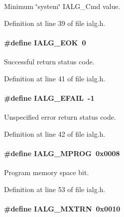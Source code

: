 Minimum \char`\"{}system\char`\"{} IALG\_\-Cmd value. 

Definition at line 39 of file ialg.h.\hypertarget{group__ti__xdais___i_a_l_g_g2c15898121a23a164e4ea2bcc4f7e7dc}{
\paragraph[IALG\_\-EOK]{\setlength{\rightskip}{0pt plus 5cm}\#define IALG\_\-EOK~0}\hfill}
\label{group__ti__xdais___i_a_l_g_g2c15898121a23a164e4ea2bcc4f7e7dc}


Successful return status code. 

Definition at line 41 of file ialg.h.\hypertarget{group__ti__xdais___i_a_l_g_g604e5600815cbd58846e0c5c05b6ba18}{
\paragraph[IALG\_\-EFAIL]{\setlength{\rightskip}{0pt plus 5cm}\#define IALG\_\-EFAIL~-1}\hfill}
\label{group__ti__xdais___i_a_l_g_g604e5600815cbd58846e0c5c05b6ba18}


Unspecified error return status code. 

Definition at line 42 of file ialg.h.\hypertarget{group__ti__xdais___i_a_l_g_g86018453b8f991c8cb545b2e43c80c9c}{
\paragraph[IALG\_\-MPROG]{\setlength{\rightskip}{0pt plus 5cm}\#define IALG\_\-MPROG~0x0008}\hfill}
\label{group__ti__xdais___i_a_l_g_g86018453b8f991c8cb545b2e43c80c9c}


Program memory space bit. 

Definition at line 53 of file ialg.h.\hypertarget{group__ti__xdais___i_a_l_g_gfc53b940e2982a2e859bda0555180eb7}{
\paragraph[IALG\_\-MXTRN]{\setlength{\rightskip}{0pt plus 5cm}\#define IALG\_\-MXTRN~0x0010}\hfill}
\label{group__ti__xdais___i_a_l_g_gfc53b940e2982a2e859bda0555180eb7}


